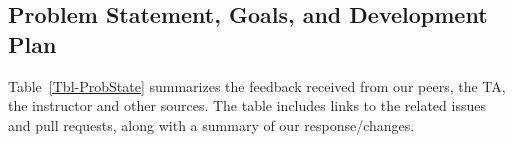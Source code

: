 \documentclass{article}
\begin{document}


\subsection{Problem Statement, Goals, and Development Plan} %

Table~\ref{Tbl-ProbState} summarizes the feedback received from our peers, the TA, the instructor and other sources.  The table includes links to the related issues and pull requests, along with a summary of our response/changes.
\end{document}
